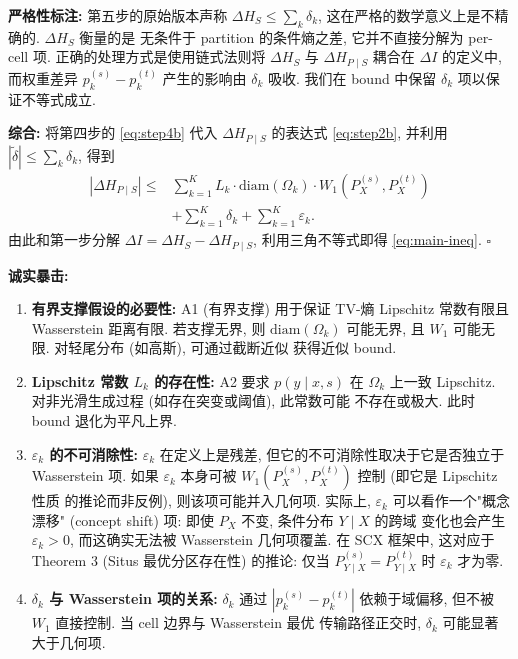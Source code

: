\documentclass[12pt,a4paper]{article}
\newcommand{\diam}{\mathrm{diam}}
\newcommand{\critique}{\medskip\noindent\textbf{诚实暴击: }}
\newcommand{\annotation}{\medskip\noindent\textbf{严格性标注: }}
\begin{document}
\medskip\noindent
\annotation 第五步的原始版本声称 $\Delta H_S\leq\sum_k\delta_k$,
这在严格的数学意义上是不精确的. $\Delta H_S$ 衡量的是
无条件于 partition 的条件熵之差, 它并不直接分解为 per-cell 项.
正确的处理方式是使用链式法则将 $\Delta H_S$ 与 $\Delta H_{P\mid S}$
耦合在 $\Delta I$ 的定义中, 而权重差异 $p^{(s)}_k-p^{(t)}_k$
产生的影响由 $\delta_k$ 吸收. 我们在 bound 中保留 $\delta_k$
项以保证不等式成立.

\medskip\noindent
\textbf{综合:}
将第四步的 \eqref{eq:step4b} 代入 $\Delta H_{P\mid S}$ 的表达式
\eqref{eq:step2b}, 并利用 $|\widetilde{\delta}|\leq\sum_k\delta_k$,
得到
\begin{align*}
    |\Delta H_{P\mid S}| \leq
    &\sum_{k=1}^{K}
       L_k\cdot\diam(\Omega_k)\cdot W_1(P^{(s)}_X,P^{(t)}_X) \\
    &+ \sum_{k=1}^{K} \delta_k
       + \sum_{k=1}^{K} \varepsilon_k.
\end{align*}
由此和第一步分解 $\Delta I = \Delta H_S - \Delta H_{P\mid S}$,
利用三角不等式即得 \eqref{eq:main-ineq}. \hfill $\square$

\bigskip
\critique
\begin{enumerate}
    \item \textbf{有界支撑假设的必要性:} A1 (有界支撑) 用于保证
          TV-熵 Lipschitz 常数有限且 Wasserstein 距离有限.
          若支撑无界, 则 $\diam(\Omega_k)$ 可能无界, 且
          $W_1$ 可能无限. 对轻尾分布 (如高斯), 可通过截断近似
          获得近似 bound.
    \item \textbf{Lipschitz 常数 $L_k$ 的存在性:} A2 要求
          $p(y\mid x,s)$ 在 $\Omega_k$ 上一致 Lipschitz.
          对非光滑生成过程 (如存在突变或阈值), 此常数可能
          不存在或极大. 此时 bound 退化为平凡上界.
    \item \textbf{$\varepsilon_k$ 的不可消除性:} $\varepsilon_k$
          在定义上是残差, 但它的不可消除性取决于它是否独立于
          Wasserstein 项. 如果 $\varepsilon_k$ 本身可被
          $W_1(P^{(s)}_X,P^{(t)}_X)$ 控制 (即它是 Lipschitz 性质
          的推论而非反例), 则该项可能并入几何项.
          实际上, $\varepsilon_k$ 可以看作一个"概念漂移" (concept
          shift) 项: 即使 $P_X$ 不变, 条件分布 $Y\mid X$ 的跨域
          变化也会产生 $\varepsilon_k>0$, 而这确实无法被
          Wasserstein 几何项覆盖. 在 SCX 框架中, 这对应于
          Theorem 3 (Situs 最优分区存在性) 的推论: 仅当
          $P^{(s)}_{Y\mid X}=P^{(t)}_{Y\mid X}$ 时 $\varepsilon_k$
          才为零.
    \item \textbf{$\delta_k$ 与 Wasserstein 项的关系:}
          $\delta_k$ 通过 $|p^{(s)}_k-p^{(t)}_k|$ 依赖于域偏移,
          但不被 $W_1$ 直接控制. 当 cell 边界与 Wasserstein 最优
          传输路径正交时, $\delta_k$ 可能显著大于几何项.
\end{enumerate}
\end{document}
